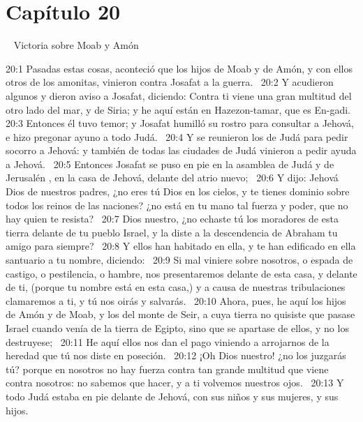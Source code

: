 																			\section*{Capítulo 20} 
																				Victoria sobre Moab y Amón  
																				
																				20:1 Pasadas estas cosas, aconteció que los hijos de Moab y de Amón, y con ellos otros de los amonitas, vinieron contra Josafat a la guerra.  
																				20:2 Y acudieron algunos y dieron aviso a Josafat, diciendo: Contra ti viene una gran multitud del otro lado del mar, y de Siria; y he aquí están en Hazezon-tamar, que es En-gadi.  
																				20:3 Entonces él tuvo temor; y Josafat humilló su rostro para consultar a Jehová, e hizo pregonar ayuno a todo Judá.  
																				20:4 Y se reunieron los de Judá para pedir socorro a Jehová: y también de todas las ciudades de Judá vinieron a pedir ayuda a Jehová.  
																				20:5 Entonces Josafat se puso en pie en la asamblea de Judá y de Jerusalén , en la casa de Jehová, delante del atrio nuevo;  
																				20:6 Y dijo: Jehová Dios de nuestros padres, ¿no eres tú Dios en los cielos, y te tienes dominio sobre todos los reinos de las naciones? ¿no está en tu mano tal fuerza y poder, que no hay quien te resista?  
																				20:7 Dios nuestro, ¿no echaste tú los moradores de esta tierra delante de tu pueblo Israel, y la diste a la descendencia de Abraham tu amigo para siempre?  
																				20:8 Y ellos han habitado en ella, y te han edificado en ella santuario a tu nombre, diciendo:  
																				20:9 Si mal viniere sobre nosotros, o espada de castigo, o pestilencia, o hambre, nos presentaremos delante de esta casa, y delante de ti, (porque tu nombre está en esta casa,) y a causa de nuestras tribulaciones clamaremos a ti, y tú nos oirás y salvarás.  
																				20:10 Ahora, pues, he aquí los hijos de Amón y de Moab, y los del monte de Seir, a cuya tierra no quisiste que pasase Israel cuando venía de la tierra de Egipto, sino que se apartase de ellos, y no los destruyese;  
																				20:11 He aquí ellos nos dan el pago viniendo a arrojarnos de la heredad que tú nos diste en poseción.  
																				20:12 ¡Oh Dios nuestro! ¿no los juzgarás tú? porque en nosotros no hay fuerza contra tan grande multitud que viene contra nosotros: no sabemos que hacer, y a ti volvemos nuestros ojos.  
																				20:13 Y todo Judá estaba en pie delante de Jehová, con sus niños y sus mujeres, y sus hijos.  
